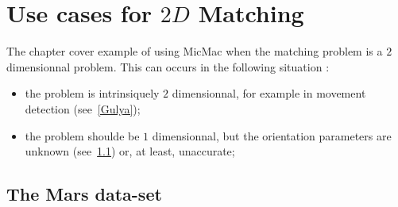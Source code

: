 \chapter{Use cases for $2D$ Matching}

The chapter cover example of using MicMac when the matching problem is
a $2$ dimensionnal problem. This can occurs in the following situation :


\begin{itemize}
   \item the problem is intrinsiquely $2$ dimensionnal, for example in
         movement detection (see~\ref{Gulya});

   \item the problem shoulde be $1$ dimensionnal, but the orientation parameters
         are unknown (see~\ref{Mars}) or, at least, unaccurate;
\end{itemize}



\section{The Mars data-set}

\label{Mars}



